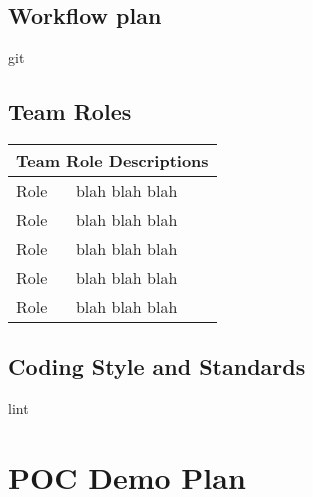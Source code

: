 \documentclass[12pt]{article}
\begin{document}
\subsection{Workflow plan}
git

\subsection{Team Roles}
	\begin{tabular}{ |p{6cm}|p{10cm}| }
	\hline
	\multicolumn{2}{|c|}{Team Role Descriptions} \\
	\hline
	Role & blah blah blah \\
	\hline
	Role & blah blah blah \\
	\hline
	Role & blah blah blah \\
	\hline
	Role & blah blah blah \\
	\hline
	Role & blah blah blah \\
	\hline
\end{tabular}

\subsection{Coding Style and Standards}
lint
\section {POC Demo Plan}
\end{document}
